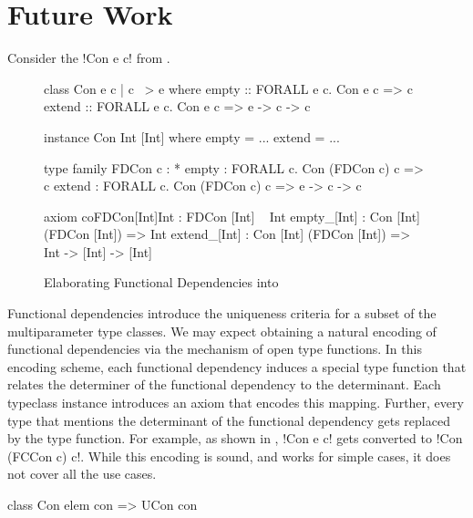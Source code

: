 \documentclass[screen,nonacm,manuscript,review]{acmart} %
\begin{document}
\section{Future Work}\label{sec:future-work}
Consider the !Con e c! from .
\begin{figure}[ht]
\begin{minipage}{0.5\linewidth}
\begin{code}
class Con e c | c ~> e where
  empty :: FORALL e c. Con e c => c
  extend :: FORALL e c. Con e c => e -> c -> c

instance Con Int [Int] where
  empty = ...
  extend = ...
\end{code}
\end{minipage}%
\begin{minipage}{0.5\linewidth}
\begin{code}
type family FDCon c : *
empty : FORALL c. Con (FDCon c) c => c
extend : FORALL c. Con (FDCon c) c => e -> c -> c

axiom coFDCon[Int]Int : FDCon [Int] ~ Int
empty_[Int]  : Con [Int] (FDCon [Int]) => Int
extend_[Int] : Con [Int] (FDCon [Int]) => Int -> [Int] -> [Int]

\end{code}
\end{minipage}
\caption[FunDeps in \SFC]{Elaborating Functional Dependencies into \SFC}
\label{fig:elab-fundeps-sfc}
\end{figure}
Functional dependencies introduce the
uniqueness criteria for a subset of the multiparameter type classes.
We may expect obtaining a natural encoding of functional dependencies
via the mechanism of open type functions. In this encoding scheme,
each functional dependency induces a special
type function that relates the determiner of the functional dependency
to the determinant. Each typeclass instance introduces an axiom that
encodes this mapping. Further, every type that mentions the
determinant of the functional dependency gets replaced by the type
function. For example, as shown in ,
!Con e c! gets converted to !Con (FCCon c) c!. While this encoding is
sound, and works for simple cases, it does not cover all the use cases.

\begin{CenteredBox}
\begin{code}
class Con elem con => UCon con
\end{code}
\end{CenteredBox}
\end{document}
